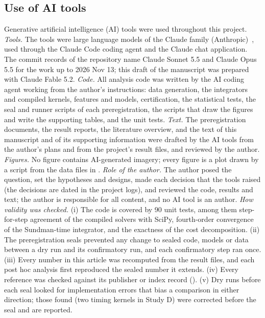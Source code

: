 \documentclass[10pt,letterpaper]{article}
\begin{document}
\subsection*{Use of AI tools}
Generative artificial intelligence (AI) tools were used throughout this project. \textit{Tools.} The tools were large language models of the Claude family (Anthropic)~\cite{anthropicclaude}, used through the Claude Code coding agent and the Claude chat application. The commit records of the repository name Claude Sonnet 5.5 and Claude Opus 5.5 for the work up to 2026 Nov 13; this draft of the manuscript was prepared with Claude Fable 5.2. \textit{Code.} All analysis code was written by the AI coding agent working from the author's instructions: data generation, the integrators and compiled kernels, features and models, certification, the statistical tests, the seal and runner scripts of each preregistration, the scripts that draw the figures and write the supporting tables, and the unit tests. \textit{Text.} The preregistration documents, the result reports, the literature overview, and the text of this manuscript and of its supporting information were drafted by the AI tools from the author's plans and from the project's result files, and reviewed by the author. \textit{Figures.} No figure contains AI-generated imagery; every figure is a plot drawn by a script from the data files in . \textit{Role of the author.} The author posed the question, set the hypotheses and designs, made each decision that the tools raised (the decisions are dated in the project logs), and reviewed the code, results and text; the author is responsible for all content, and no AI tool is an author. \textit{How validity was checked.} (i) The code is covered by 90 unit tests, among them step-for-step agreement of the compiled solvers with SciPy, fourth-order convergence of the Sundman-time integrator, and the exactness of the cost decomposition. (ii) The preregistration seals prevented any change to sealed code, models or data between a dry run and its confirmatory run, and each confirmatory step ran once. (iii) Every number in this article was recomputed from the result files, and each post hoc analysis first reproduced the sealed number it extends. (iv) Every reference was checked against its publisher or index record (). (v) Dry runs before each seal looked for implementation errors that bias a comparison in either direction; those found (two timing kernels in Study D) were corrected before the seal and are reported.
\end{document}

